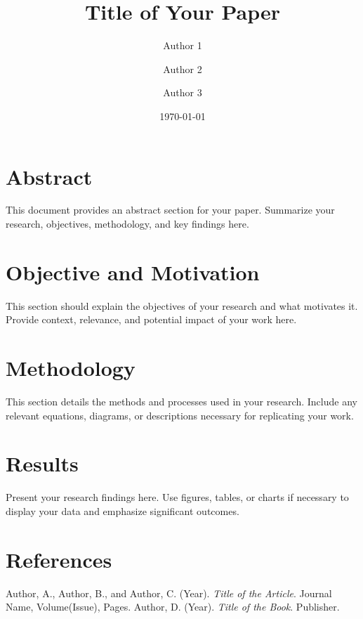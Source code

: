 \documentclass[12pt]{article}
\title{Title of Your Paper}
\author{Author 1 \and Author 2 \and Author 3}
\date{\today}
\begin{document}
\maketitle

\newpage
\tableofcontents
\newpage

\section{Abstract}
This document provides an abstract section for your paper. Summarize your research, objectives, methodology, and key findings here.

\newpage

\section{Objective and Motivation}
This section should explain the objectives of your research and what motivates it. Provide context, relevance, and potential impact of your work here.

\newpage

\section{Methodology}
This section details the methods and processes used in your research. Include any relevant equations, diagrams, or descriptions necessary for replicating your work.

\newpage

\section{Results}
Present your research findings here. Use figures, tables, or charts if necessary to display your data and emphasize significant outcomes.

\newpage

\section{References}

 Author, A., Author, B., and Author, C. (Year). \textit{Title of the Article}. Journal Name, Volume(Issue), Pages.
 Author, D. (Year). \textit{Title of the Book}. Publisher.
\end{document}

